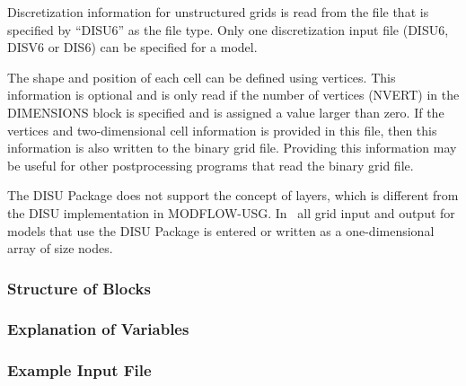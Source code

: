 Discretization information for unstructured grids is read from the file that is specified by ``DISU6'' as the file type.  Only one discretization input file (DISU6, DISV6 or DIS6) can be specified for a model.

The shape and position of each cell can be defined using vertices.  This information is optional and is only read if the number of vertices (NVERT) in the DIMENSIONS block is specified and is assigned a value larger than zero.  If the vertices and two-dimensional cell information is provided in this file, then this information is also written to the binary grid file.  Providing this information may be useful for other postprocessing programs that read the binary grid file.

The DISU Package does not support the concept of layers, which is different from the DISU implementation in MODFLOW-USG.  In \mf~all grid input and output for models that use the DISU Package is entered or written as a one-dimensional array of size nodes.

\vspace{5mm}
\subsubsection{Structure of Blocks}







\vspace{5mm}
\subsubsection{Explanation of Variables}
\begin{description}

\end{description}

\vspace{5mm}
\subsubsection{Example Input File}


